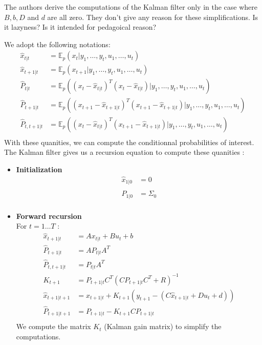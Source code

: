 The authors derive the computations of the Kalman filter only in the case where $B,b,D$ and $d$ are all zero.
They don't give any reason for these simplifications.
Is it lazyness?
Is it intended for pedagoical reason?

We adopt the following notations:
\begin{align*}
  \hat{x}_{t|t} &= \mathbb{E}_p \left (x_t|y_1, \ldots , y_t, u_1, \ldots , u_t \right ) \\
  \hat{x}_{t+1|t} &= \mathbb{E}_p \left (x_{t+1}|y_1, \ldots , y_t, u_1, \ldots , u_t \right ) \\
  \hat{P}_{t|t} &= \mathbb{E}_p \left ((x_t - \hat{x}_{t|t})^T(x_t - \hat{x}_{t|t})|y_1, \ldots , y_t, u_1, \ldots , u_t \right ) \\
  \hat{P}_{t+1|t} &= \mathbb{E}_p \left ((x_{t+1} - \hat{x}_{t+1|t})^T(x_{t+1} - \hat{x}_{t+1|t})|y_1, \ldots , y_t, u_1, \ldots , u_t \right ) \\
  \hat{P}_{t,t+1|t} &= \mathbb{E}_p \left ((x_t - \hat{x}_{t|t})^T(x_{t+1} - \hat{x}_{t+1|t})|y_1, \ldots , y_t, u_1, \ldots , u_t \right ) \\
\end{align*}
With these quanities, we can compute the conditionnal probabilities of interest.
The Kalman filter gives us a recursion equation to compute these quanities :
\begin{itemize}
  \item \textbf{Initialization}\\
    \begin{align*}
      \hat{x}_{1|0} &= 0\\
      \hat{P}_{1|0} &= \Sigma_0\\
    \end{align*}
  \item \textbf{Forward recursion}\\
    For $t=1 \ldots T$ :
    \begin{align*}
      \hat{x}_{t+1|t} &= A x_{t|t} + B u_t + b\\
      \hat{P}_{t+1|t} &= A P_{t|t} A^T\\
      \hat{P}_{t,t+1|t} &= P_{t|t}A^T\\
      K_{t+1} &= P_{t+1|t}C^T(C P_{t+1|t} C^T + R)^{-1}\\
      \hat{x}_{t+1|t+1} &= x_{t+1|t} + K_{t+1} \left (y_{t+1} - (C\hat{x}_{t+1|t} + D u_t + d) \right )\\
      \hat{P}_{t+1|t+1} &= P_{t+1|t} - K_{t+1} C P_{t+1|t}\\
    \end{align*}
    We compute the matrix $K_{t}$ (Kalman gain matrix) to simplify the computations.
\end{itemize}

